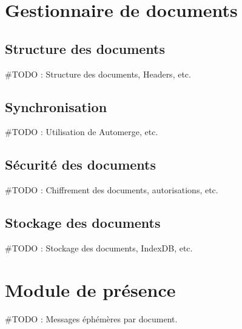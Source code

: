 \section{Gestionnaire de documents}
\subsection{Structure des documents}
#TODO : Structure des documents, Headers, etc.
\subsection{Synchronisation}
#TODO : Utilisation de Automerge, etc.
\subsection{Sécurité des documents}
#TODO : Chiffrement des documents, autorisations, etc.
\subsection{Stockage des documents}
#TODO : Stockage des documents, IndexDB, etc.

\section{Module de présence}
#TODO : Messages éphémères par document.
